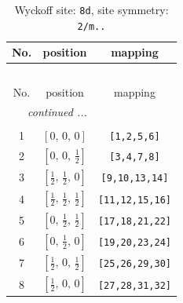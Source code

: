 \documentclass[fleqn,8pt]{jsarticle}
\begin{document}
\begin{longtable}{ccc}
\caption{Wyckoff site: {\tt 8d}, site symmetry: {\tt 2/m..}}
 \\
 \hline \hline
No. & position & mapping \\ \hline \endfirsthead

\multicolumn{2}{l}{\tablename\ \thetable{}} \\
 \hline \hline
No. & position & mapping \\ \hline \endhead

 \hline \hline
\multicolumn{2}{r}{\footnotesize\it continued ...} \\ \endfoot

 \hline \hline
\multicolumn{2}{r}{} \\ \endlastfoot

1 & $\left[ 0,\, 0,\, 0 \right]$ & {\tt [1,2,5,6]} \\ \hline
2 & $\left[ 0,\, 0,\, \frac{1}{2} \right]$ & {\tt [3,4,7,8]} \\ \hline
3 & $\left[ \frac{1}{2},\, \frac{1}{2},\, 0 \right]$ & {\tt [9,10,13,14]} \\ \hline
4 & $\left[ \frac{1}{2},\, \frac{1}{2},\, \frac{1}{2} \right]$ & {\tt [11,12,15,16]} \\ \hline
5 & $\left[ 0,\, \frac{1}{2},\, \frac{1}{2} \right]$ & {\tt [17,18,21,22]} \\ \hline
6 & $\left[ 0,\, \frac{1}{2},\, 0 \right]$ & {\tt [19,20,23,24]} \\ \hline
7 & $\left[ \frac{1}{2},\, 0,\, \frac{1}{2} \right]$ & {\tt [25,26,29,30]} \\ \hline
8 & $\left[ \frac{1}{2},\, 0,\, 0 \right]$ & {\tt [27,28,31,32]} \\
\end{longtable}
\renewcommand{\arraystretch}{1.2}
\end{document}
